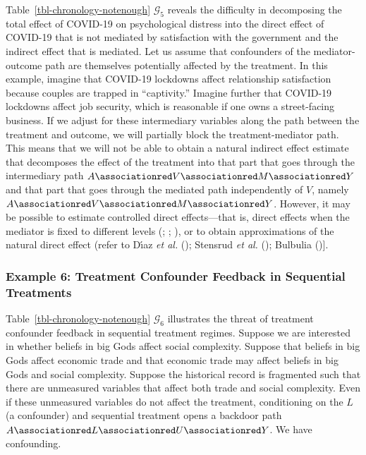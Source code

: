 \documentclass[
  single column]{article}
\begin{document}
Table~\ref{tbl-chronology-notenough} \(\mathcal{G}_5\) reveals the
difficulty in decomposing the total effect of COVID-19 on psychological
distress into the direct effect of COVID-19 that is not mediated by
satisfaction with the government and the indirect effect that is
mediated. Let us assume that confounders of the mediator-outcome path
are themselves potentially affected by the treatment. In this example,
imagine that COVID-19 lockdowns affect relationship satisfaction because
couples are trapped in ``captivity.'' Imagine further that COVID-19
lockdowns affect job security, which is reasonable if one owns a
street-facing business. If we adjust for these intermediary variables
along the path between the treatment and outcome, we will partially
block the treatment-mediator path. This means that we will not be able
to obtain a natural indirect effect estimate that decomposes the effect
of the treatment into that part that goes through the intermediary path
\(A \associationred V \associationred M \associationred Y\) and that
part that goes through the mediated path independently of \(V\), namely
\(A \associationred V \associationred M \associationred Y\). However, it
may be possible to estimate controlled direct effects---that is, direct
effects when the mediator is fixed to different levels
(;
;
), or to obtain
approximations of the natural direct effect (refer to Dı́az \emph{et al.}
(); Stensrud \emph{et al.}
(); Bulbulia
(){]}.

\subsubsection{Example 6: Treatment Confounder Feedback in Sequential
Treatments}\label{example-6-treatment-confounder-feedback-in-sequential-treatments}

Table~\ref{tbl-chronology-notenough} \(\mathcal{G}_6\) illustrates the
threat of treatment confounder feedback in sequential treatment regimes.
Suppose we are interested in whether beliefs in big Gods affect social
complexity. Suppose that beliefs in big Gods affect economic trade and
that economic trade may affect beliefs in big Gods and social
complexity. Suppose the historical record is fragmented such that there
are unmeasured variables that affect both trade and social complexity.
Even if these unmeasured variables do not affect the treatment,
conditioning on the \(L\) (a confounder) and sequential treatment opens
a backdoor path
\(A \associationred L \associationred U \associationred Y\). We have
confounding.
\end{document}
